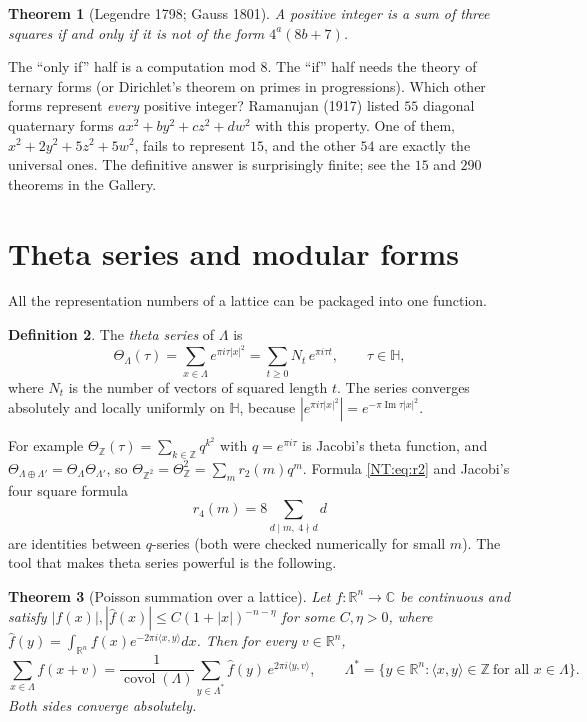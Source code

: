 \documentclass[11pt,openany]{book}
\theoremstyle{plain}
\newtheorem{theorem}{Theorem}[chapter]
\theoremstyle{definition}
\newtheorem{definition}[theorem]{Definition}
\theoremstyle{remark}
\newcommand{\R}{\mathbb{R}}
\newcommand{\Z}{\mathbb{Z}}
\newcommand{\C}{\mathbb{C}}
\newcommand{\Lat}{\Lambda}             %
\newcommand{\covol}{\operatorname{covol}}
\newcommand{\abs}[1]{\left\lvert #1 \right\rvert}
\newcommand{\ip}[2]{\langle #1, #2\rangle}
\begin{document}
\begin{theorem}[Legendre 1798; Gauss 1801]\label{NT:thm:legendre}
A positive integer is a sum of three squares if and only if it is not of the form $4^a(8b+7)$.
\end{theorem}

The ``only if'' half is a computation mod $8$. The ``if'' half needs the theory of ternary forms (or
Dirichlet's theorem on primes in progressions). Which other forms represent \emph{every} positive integer?
Ramanujan (1917) listed $55$ diagonal quaternary forms $ax^2+by^2+cz^2+dw^2$ with this property. One of
them, $x^2+2y^2+5z^2+5w^2$, fails to represent $15$, and the other $54$ are exactly the universal ones. The definitive answer is surprisingly finite; see the $15$ and $290$ theorems in
the Gallery.

\section{Theta series and modular forms}
\label{NT:sec:theta}

All the representation numbers of a lattice can be packaged into one function.

\begin{definition}\label{NT:def:theta}
The \emph{theta series} of $\Lat$ is
\[
  \Theta_\Lat(\tau)=\sum_{x\in\Lat}e^{\pi i\tau\abs x^2}=\sum_{t\ge0}N_t\,e^{\pi i\tau t},
  \qquad \tau\in\mathbb H,
\]
where $N_t$ is the number of vectors of squared length $t$. The series converges absolutely and locally
uniformly on $\mathbb H$, because $\abs{e^{\pi i\tau\abs x^2}}=e^{-\pi\operatorname{Im}\tau\abs x^2}$.
\end{definition}

For example $\Theta_{\Z}(\tau)=\sum_{k\in\Z}q^{k^2}$ with $q=e^{\pi i\tau}$ is Jacobi's theta function,
and $\Theta_{\Lat\oplus\Lat'}=\Theta_\Lat\Theta_{\Lat'}$, so
$\Theta_{\Z^2}=\Theta_\Z^2=\sum_mr_2(m)q^m$. Formula \eqref{NT:eq:r2} and Jacobi's four square formula
\begin{equation}\label{NT:eq:r4}
  r_4(m)=8\sum_{d\mid m,\ 4\nmid d}d
\end{equation}
are identities between $q$-series (both were checked numerically for small $m$). The tool that makes
theta series powerful is the following.

\begin{theorem}[Poisson summation over a lattice]\label{NT:thm:poisson}
Let $f\colon\R^n\to\C$ be continuous and satisfy $\abs{f(x)},\abs{\hat f(x)}\le C(1+\abs x)^{-n-\eta}$ for some $C,\eta>0$,
where $\hat f(y)=\int_{\R^n}f(x)e^{-2\pi i\ip xy}dx$. Then for every $v\in\R^n$,
\[
  \sum_{x\in\Lat}f(x+v)=\frac{1}{\covol(\Lat)}\sum_{y\in\Lat^*}\hat f(y)\,e^{2\pi i\ip yv},
  \qquad \Lat^*=\{y\in\R^n:\ip xy\in\Z\ \text{for all }x\in\Lat\}.
\]
Both sides converge absolutely.
\end{theorem}
\end{document}

